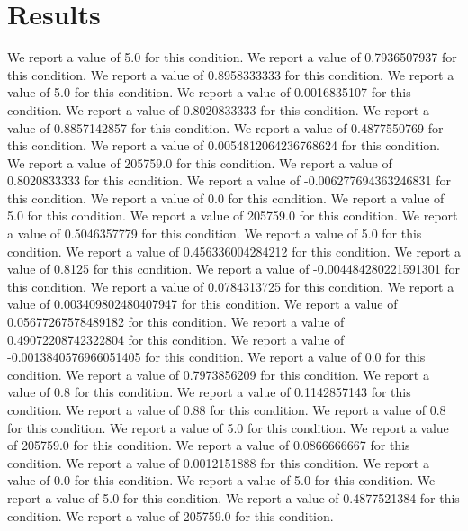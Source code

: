 \documentclass{article}
\begin{document}
\section{Results}
We report a value of 5.0 for this condition.
We report a value of 0.7936507937 for this condition.
We report a value of 0.8958333333 for this condition.
We report a value of 5.0 for this condition.
We report a value of 0.0016835107 for this condition.
We report a value of 0.8020833333 for this condition.
We report a value of 0.8857142857 for this condition.
We report a value of 0.4877550769 for this condition.
We report a value of 0.0054812064236768624 for this condition.
We report a value of 205759.0 for this condition.
We report a value of 0.8020833333 for this condition.
We report a value of -0.006277694363246831 for this condition.
We report a value of 0.0 for this condition.
We report a value of 5.0 for this condition.
We report a value of 205759.0 for this condition.
We report a value of 0.5046357779 for this condition.
We report a value of 5.0 for this condition.
We report a value of 0.456336004284212 for this condition.
We report a value of 0.8125 for this condition.
We report a value of -0.004484280221591301 for this condition.
We report a value of 0.0784313725 for this condition.
We report a value of 0.003409802480407947 for this condition.
We report a value of 0.05677267578489182 for this condition.
We report a value of 0.49072208742322804 for this condition.
We report a value of -0.0013840576966051405 for this condition.
We report a value of 0.0 for this condition.
We report a value of 0.7973856209 for this condition.
We report a value of 0.8 for this condition.
We report a value of 0.1142857143 for this condition.
We report a value of 0.88 for this condition.
We report a value of 0.8 for this condition.
We report a value of 5.0 for this condition.
We report a value of 205759.0 for this condition.
We report a value of 0.0866666667 for this condition.
We report a value of 0.0012151888 for this condition.
We report a value of 0.0 for this condition.
We report a value of 5.0 for this condition.
We report a value of 5.0 for this condition.
We report a value of 0.4877521384 for this condition.
We report a value of 205759.0 for this condition.
\end{document}
